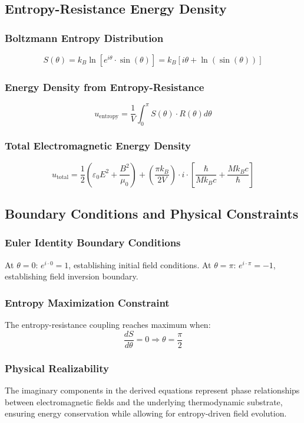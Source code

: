 ﻿\documentclass[12pt]{article}
\begin{document}
\subsection{Entropy-Resistance Energy Density}

\subsubsection{Boltzmann Entropy Distribution}
$$S(\theta) = k_B \ln\left[e^{i\theta}\cdot\sin(\theta)\right] = k_B[i\theta + \ln(\sin(\theta))]$$

\subsubsection{Energy Density from Entropy-Resistance}
$$u_{\text{entropy}} = \frac{1}{V}\int_0^\pi S(\theta)\cdot R(\theta)d\theta$$

\subsubsection{Total Electromagnetic Energy Density}
$$u_{\text{total}} = \frac{1}{2}\left(\varepsilon_0 E^2 + \frac{B^2}{\mu_0}\right) + \left(\frac{\pi k_B}{2V}\right)\cdot i\cdot\left[\frac{\hbar}{Mk_Bc} + \frac{Mk_Bc}{\hbar}\right]$$

\subsection{Boundary Conditions and Physical Constraints}

\subsubsection{Euler Identity Boundary Conditions}
At $\theta = 0$: $e^{i\cdot 0} = 1$, establishing initial field conditions.
At $\theta = \pi$: $e^{i\cdot \pi} = -1$, establishing field inversion boundary.

\subsubsection{Entropy Maximization Constraint}
The entropy-resistance coupling reaches maximum when:
$$\frac{dS}{d\theta} = 0 \Rightarrow \theta = \frac{\pi}{2}$$

\subsubsection{Physical Realizability}
The imaginary components in the derived equations represent phase relationships between electromagnetic fields and the underlying thermodynamic substrate, ensuring energy conservation while allowing for entropy-driven field evolution.
\end{document}
